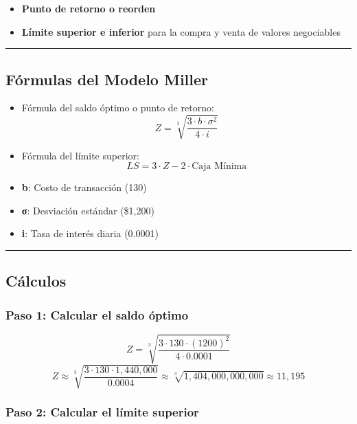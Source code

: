\documentclass[
  letterpaper,
  DIV=11,
  numbers=noendperiod]{scrartcl}
\providecommand{\tightlist}{%
  \setlength{\itemsep}{0pt}\setlength{\parskip}{0pt}}\usepackage{longtable,booktabs,array}
\begin{document}
\begin{itemize}
\tightlist
\item
  \textbf{Punto de retorno o reorden}
\item
  \textbf{Límite superior e inferior} para la compra y venta de valores
  negociables
\end{itemize}

\begin{center}\rule{0.5\linewidth}{0.5pt}\end{center}

\subsection{Fórmulas del Modelo
Miller}\label{fuxf3rmulas-del-modelo-miller}

\begin{itemize}
\tightlist
\item
  Fórmula del saldo óptimo o punto de retorno: \[
  Z = \sqrt[3]{\frac{3 \cdot b \cdot \sigma^2}{4 \cdot i}}
  \]
\item
  Fórmula del límite superior: \[
  LS = 3 \cdot Z - 2 \cdot \text{Caja Mínima}
  \]
\item
  \textbf{b}: Costo de transacción (130)
\item
  \textbf{σ}: Desviación estándar (\$1,200)
\item
  \textbf{i}: Tasa de interés diaria (0.0001)
\end{itemize}

\begin{center}\rule{0.5\linewidth}{0.5pt}\end{center}

\subsection{Cálculos}\label{cuxe1lculos}

\subsubsection{Paso 1: Calcular el saldo
óptimo}\label{paso-1-calcular-el-saldo-uxf3ptimo}

\[
Z = \sqrt[3]{\frac{3 \cdot 130 \cdot (1200)^2}{4 \cdot 0.0001}}
\] \[
Z ≈ \sqrt[3]{\frac{3 \cdot 130 \cdot 1,440,000}{0.0004}} ≈ \sqrt[3]{1,404,000,000,000} ≈ 11,195
\]

\subsubsection{Paso 2: Calcular el límite
superior}\label{paso-2-calcular-el-luxedmite-superior}
\end{document}
